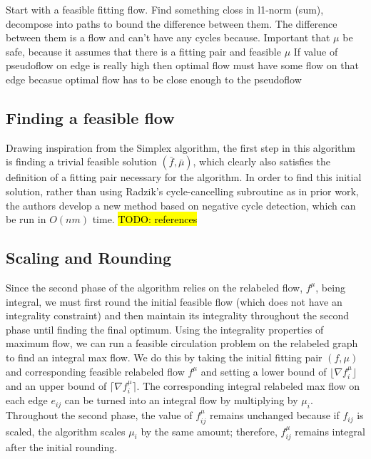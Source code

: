 \documentclass[11pt]{article}
\theoremstyle{definition}
\theoremstyle{definition}
\newcommand{\todo}[1]{\hl{TODO: #1}}
\begin{document}
Start with a feasible fitting flow. Find something closs in l1-norm (sum), decompose into paths to bound the difference between them. The difference between them is a flow and can't have any cycles because.
Important that $\mu$ be safe, because it assumes that there is a fitting pair and feasible $\mu$
If value of pseudoflow on edge is really high then optimal flow must have some flow on that edge becasue optimal flow has to be close enough to the pseudoflow


    \subsection{Finding a feasible flow}
Drawing inspiration from the Simplex algorithm, the first step in this algorithm is finding a trivial feasible solution $(\bar{f}, \bar{\mu})$, which clearly also satisfies the definition of a fitting pair necessary for the algorithm. In order to find this initial solution, rather than using Radzik's cycle-cancelling subroutine as in prior work, the authors develop a new method based on negative cycle detection, which can be run in $O(nm)$ time. \todo{references} 
    
    \subsection{Scaling and Rounding} 
    Since the second phase of the algorithm relies on the relabeled flow, $f^\mu$, being integral, we must first round the initial feasible flow (which does not have an integrality constraint) and then maintain its integrality throughout the second phase until finding the final optimum. Using the integrality properties of maximum flow, we can run a feasible circulation problem on the relabeled graph to find an integral max flow. We do this by taking the initial fitting pair $(f, \mu)$ and corresponding feasible relabeled flow $f^\mu$ and setting a lower bound of $\lfloor \nabla f_i^\mu \rfloor$ and an upper bound of $\lceil \nabla f_i^\mu \rceil$. The corresponding integral relabeled max flow on each edge $e_{ij}$ can be turned into an integral flow by multiplying by $\mu_i$. Throughout the second phase, the value of $f_{ij}^\mu$ remains unchanged because if $f_{ij}$ is scaled, the algorithm scales $\mu_i$ by the same amount; therefore, $f_{ij}^\mu$ remains integral after the initial rounding.
    
\end{document}
